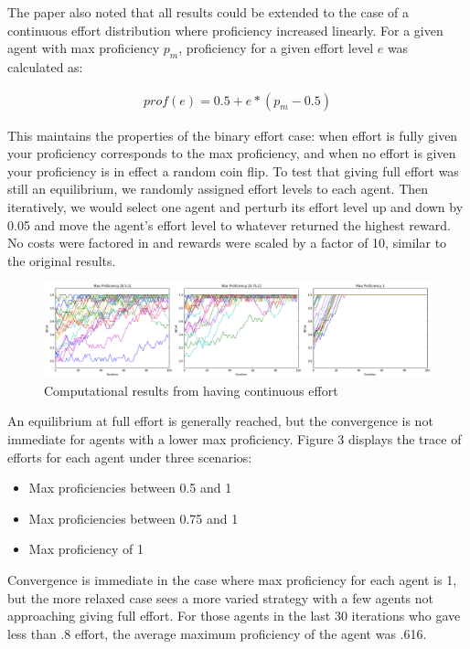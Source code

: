 \documentclass{scrartcl}
\begin{document}
The paper also noted that all results could be extended to the case of a continuous effort distribution where proficiency increased linearly. For a given agent with max proficiency $p_m$, proficiency for a given effort level $e$ was calculated as:

\begin{eqnarray*}
	prof(e) = 0.5 + e*(p_m - 0.5)
\end{eqnarray*}

This maintains the properties of the binary effort case: when effort is fully given your proficiency corresponds to the max proficiency, and when no effort is given your proficiency is in effect a random coin flip. To test that giving full effort was still an equilibrium, we randomly assigned effort levels to each agent. Then iteratively, we would select one agent and perturb its effort level up and down by 0.05 and move the agent's effort level to whatever returned the highest reward. No costs were factored in and rewards were scaled by a factor of 10, similar to the original results.

\begin{figure}[H]
	\caption{Computational results from having continuous effort}
	\centering
	\includegraphics[width=1.0\textwidth]{continuous_effort}
\end{figure}

An equilibrium at full effort is generally reached, but the convergence is not immediate for agents with a lower max proficiency. Figure 3 displays the trace of efforts for each agent under three scenarios:
\begin{itemize}
	\item Max proficiencies between 0.5 and 1
	\item Max proficiencies between 0.75 and 1
	\item Max proficiency of 1
\end{itemize}
Convergence is immediate in the case where max proficiency for each agent is 1, but the more relaxed case sees a more varied strategy with a few agents not approaching giving full effort. For those agents in the last 30 iterations who gave less than .8 effort, the average maximum proficiency of the agent was .616.
\end{document}
